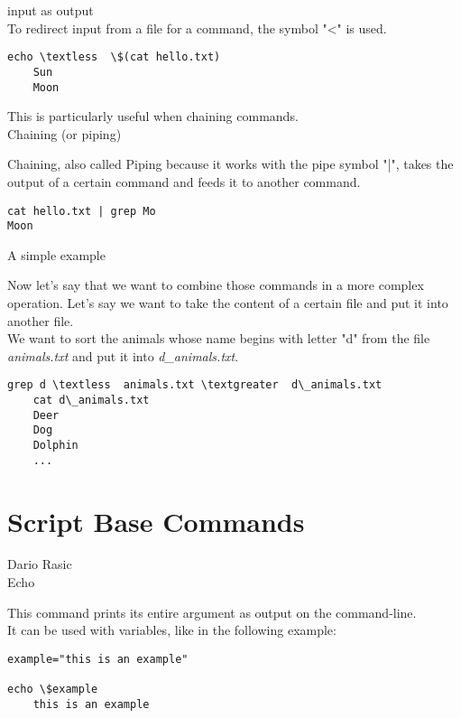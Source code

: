 \documentclass[hidelinks,12pt,a4paper,numbers=enddot]{scrartcl}
\begin{document}
input as output
\\
To redirect input from a file for a command, the symbol "\textless " is used.

\begin{verbatim}
echo \textless  \$(cat hello.txt)
    Sun
    Moon
\end{verbatim}

This is particularly useful when chaining commands.\\


Chaining (or piping)

Chaining, also called Piping because it works with the pipe symbol "|", takes
the output of a certain command and feeds it to another command.
\begin{verbatim}
cat hello.txt | grep Mo
Moon
\end{verbatim}

A simple example

Now let's say that we want to combine those commands in a more complex operation.
Let's say we want to take the content of a certain file and put it into another file.\\

We want to sort the animals whose name begins with letter "d" from the file
\emph{animals.txt} and put it into \emph{d\_animals.txt}.\\

\begin{verbatim}
grep d \textless  animals.txt \textgreater  d\_animals.txt
    cat d\_animals.txt
    Deer
    Dog
    Dolphin
    ...
\end{verbatim}

\section{Script  Base Commands}


\large Dario Rasic \normalsize\\



Echo

This command prints its entire argument as output on the command-line.\\
    It can be used with variables, like in the following example:\\

\begin{verbatim}
example="this is an example"

echo \$example
    this is an example
\end{verbatim}
\end{document}
